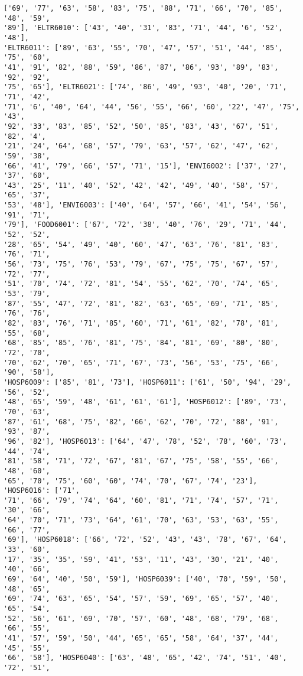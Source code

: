 \documentclass[11pt]{article}
\begin{document}
\begin{Verbatim}[commandchars=\\\{\}]
['69', '77', '63', '58', '83', '75', '88', '71', '66', '70', '85', '48', '59',
'89'], 'ELTR6010': ['43', '40', '31', '83', '71', '44', '6', '52', '48'],
'ELTR6011': ['89', '63', '55', '70', '47', '57', '51', '44', '85', '75', '60',
'41', '91', '82', '88', '59', '86', '87', '86', '93', '89', '83', '92', '92',
'75', '65'], 'ELTR6021': ['74', '86', '49', '93', '40', '20', '71', '71', '42',
'71', '6', '40', '64', '44', '56', '55', '66', '60', '22', '47', '75', '43',
'92', '33', '83', '85', '52', '50', '85', '83', '43', '67', '51', '82', '4',
'21', '24', '64', '68', '57', '79', '63', '57', '62', '47', '62', '59', '38',
'66', '41', '79', '66', '57', '71', '15'], 'ENVI6002': ['37', '27', '37', '60',
'43', '25', '11', '40', '52', '42', '42', '49', '40', '58', '57', '65', '37',
'53', '48'], 'ENVI6003': ['40', '64', '57', '66', '41', '54', '56', '91', '71',
'79'], 'FOOD6001': ['67', '72', '38', '40', '76', '29', '71', '44', '52', '52',
'28', '65', '54', '49', '40', '60', '47', '63', '76', '81', '83', '76', '71',
'56', '73', '75', '76', '53', '79', '67', '75', '75', '67', '57', '72', '77',
'51', '70', '74', '72', '81', '54', '55', '62', '70', '74', '65', '53', '79',
'87', '55', '47', '72', '81', '82', '63', '65', '69', '71', '85', '76', '76',
'82', '83', '76', '71', '85', '60', '71', '61', '82', '78', '81', '55', '68',
'68', '85', '85', '76', '81', '75', '84', '81', '69', '80', '80', '72', '70',
'70', '62', '70', '65', '71', '67', '73', '56', '53', '75', '66', '90', '58'],
'HOSP6009': ['85', '81', '73'], 'HOSP6011': ['61', '50', '94', '29', '56', '52',
'48', '65', '59', '48', '61', '61', '61'], 'HOSP6012': ['89', '73', '70', '63',
'87', '61', '68', '75', '82', '66', '62', '70', '72', '88', '91', '93', '87',
'96', '82'], 'HOSP6013': ['64', '47', '78', '52', '78', '60', '73', '44', '74',
'81', '58', '71', '72', '67', '81', '67', '75', '58', '55', '66', '48', '60',
'65', '70', '75', '60', '60', '74', '70', '67', '74', '23'], 'HOSP6016': ['71',
'71', '66', '79', '74', '64', '60', '81', '71', '74', '57', '71', '30', '66',
'64', '70', '71', '73', '64', '61', '70', '63', '53', '63', '55', '66', '77',
'69'], 'HOSP6018': ['66', '72', '52', '43', '43', '78', '67', '64', '33', '60',
'17', '35', '35', '59', '41', '53', '11', '43', '30', '21', '40', '40', '66',
'69', '64', '40', '50', '59'], 'HOSP6039': ['40', '70', '59', '50', '48', '65',
'69', '74', '63', '65', '54', '57', '59', '69', '65', '57', '40', '65', '54',
'52', '56', '61', '69', '70', '57', '60', '48', '68', '79', '68', '66', '55',
'41', '57', '59', '50', '44', '65', '65', '58', '64', '37', '44', '45', '55',
'66', '58'], 'HOSP6040': ['63', '48', '65', '42', '74', '51', '40', '72', '51',

\end{Verbatim}
\end{document}
